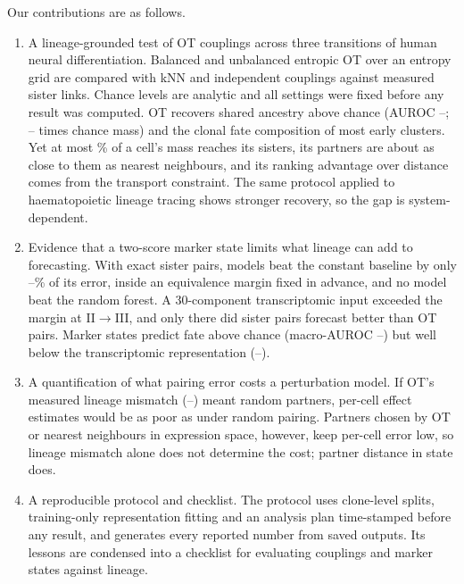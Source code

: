 \documentclass[10pt,journal,compsoc]{IEEEtran}
\begin{document}
Our contributions are as follows.
\begin{enumerate}
\item A lineage-grounded test of OT couplings across three transitions of human neural
differentiation. Balanced and unbalanced entropic OT over an entropy grid are compared
with kNN and independent couplings against measured sister links. Chance levels are
analytic and all settings were fixed before any result was computed. OT recovers shared ancestry above chance
(AUROC \rqOneAUROCMinT--\rqOneAUROCMaxT; \rqOneEnrMinT--\rqOneEnrMaxT{} times chance mass)
and the clonal fate composition of most early clusters. Yet at most \rqOneMassPctMaxT\% of
a cell's mass reaches its sisters, its partners are about as close to them as nearest
neighbours, and its ranking advantage over distance comes from the transport constraint.
The same protocol applied to haematopoietic lineage tracing shows stronger recovery, so the
gap is system-dependent.
\item Evidence that a two-score marker state limits what lineage can add to forecasting.
With exact sister pairs, models beat the constant baseline by only
\rqTwoTrueGainMinPct--\rqTwoTrueGainMaxPct\% of its error, inside an equivalence margin
fixed in advance, and no model beat the random forest. A 30-component transcriptomic input
exceeded the margin at II$\to$III, and only there did sister pairs forecast better than OT
pairs. Marker states predict fate above
chance (macro-AUROC \rqThreeAUCPgDMinT--\rqThreeAUCPgDMaxT) but well below the
transcriptomic representation (\rqThreeAUCPCMinT--\rqThreeAUCPCMaxT).
\item A quantification of what pairing error costs a perturbation model. If OT's measured
lineage mismatch (\rqFourMeasMin--\rqFourMeasMax) meant random partners, per-cell effect
estimates would be as poor as under random pairing. Partners chosen by OT or nearest
neighbours in expression space, however, keep per-cell error low, so lineage mismatch alone
does not determine the cost; partner distance in state does.
\item A reproducible protocol and checklist. The protocol uses
clone-level splits, training-only representation fitting and an analysis plan time-stamped
before any result, and generates every reported number from saved outputs. Its lessons
are condensed into a checklist for evaluating couplings and marker states against lineage.
\end{enumerate}

\end{document}

